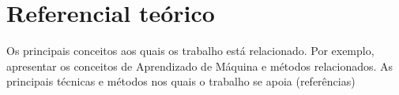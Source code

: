 \section{Referencial teórico}
Os principais conceitos aos quais os trabalho está relacionado. Por exemplo, apresentar os conceitos de Aprendizado de Máquina e métodos relacionados.
As principais técnicas e métodos nos quais o trabalho se apoia (referências)